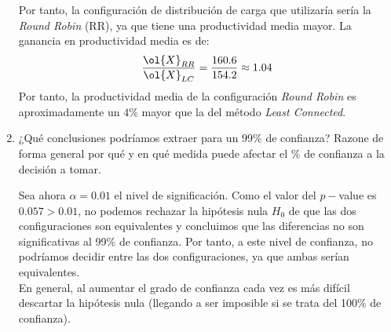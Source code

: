 \begin{ejercicio}
\begin{enumerate}
    Por tanto, la configuración de distribución de carga que utilizaría sería la \emph{Round Robin} (RR), ya que tiene una productividad media mayor. La ganancia en productividad media es de:
    \begin{align*}
        \dfrac{\ol{X}_{RR}}{\ol{X}_{LC}} = \dfrac{160.6}{154.2} \approx 1.04
    \end{align*}
    Por tanto, la productividad media de la configuración \emph{Round Robin} es aproximadamente un $4\%$ mayor que la del método \emph{Least Connected}.
    

    \item ¿Qué conclusiones podríamos extraer para un 99\% de confianza? Razone de forma general por qué y en qué medida puede afectar el \% de confianza a la decisión a tomar.

    Sea ahora $\alpha=0.01$ el nivel de significación. Como el valor del $p-$value es $0.057>0.01$, no podemos rechazar la hipótesis nula $H_0$ de que las dos configuraciones son equivalentes y concluimos que las diferencias no son significativas al 99\% de confianza. Por tanto, a este nivel de confianza, no podríamos decidir entre las dos configuraciones, ya que ambas serían equivalentes.\\

    En general, al aumentar el grado de confianza cada vez es más difícil descartar la hipótesis nula (llegando a ser imposible si se trata del 100\% de confianza).
\end{enumerate}
\end{ejercicio}
\begin{comment}Sol:
a) Al 90\% de nivel de confianza las diferencias sí son significativas. Deberíamos elegir el de mayor productividad media. En este caso, el método de \emph{Round Robin} tiene $6.4$ MB/s más de productividad media ($160.6$ MB/s frente a los $154.2$ MB/s del \emph{Least Connected}, por lo que es $1.04$ veces mayor o un $4\%$ mayor).
b) Al 99\% ya no podríamos asegurar que las diferencias son significativas por lo que consideraríamos ambos métodos iguales. Al aumentar el \% de nivel confianza lo que realmente estoy haciendo es aumentar el ancho de los intervalos de confianza de tal forma que cada vez sea más difícil descartar la hipótesis nula de que ambas alternativas tienen rendimientos equivalentes. Otra forma de verlo es que al aumentar el \% de nivel de confianza, el grado de significatividad ($\alpha$) baja por lo que es más difícil rechazar la hipótesis nula (el $p$-value tiene que ser todavía más pequeño). Para un $100\%$ de nivel de confianza nunca podríamos rechazar $H_0$.
\end{comment}


